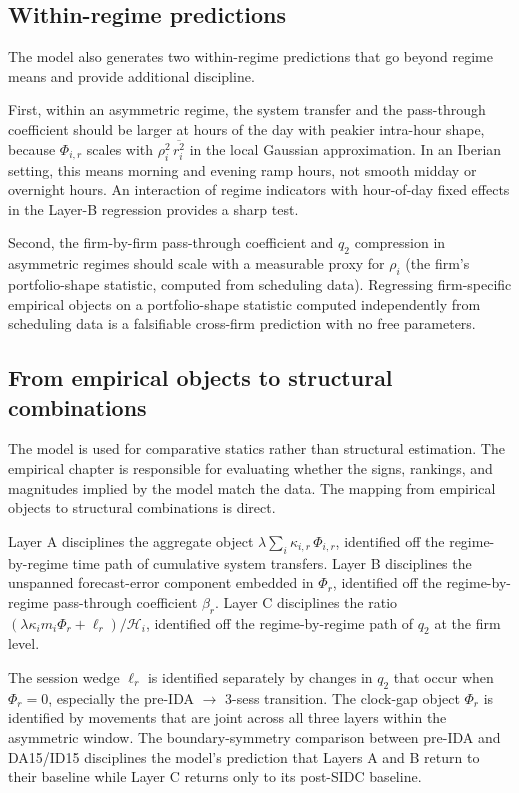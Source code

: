 \documentclass[11pt]{article}
\begin{document}
\subsection{Within-regime predictions}
\label{sec:model-within}

The model also generates two within-regime predictions that go beyond regime means and provide additional discipline.

First, within an asymmetric regime, the system transfer and the pass-through coefficient should be larger at hours of the day with peakier intra-hour shape, because $\Phi_{i,r}$ scales with $\rho_{i}^{2}\,\overline{r_{i}^{2}}$ in the local Gaussian approximation. In an Iberian setting, this means morning and evening ramp hours, not smooth midday or overnight hours. An interaction of regime indicators with hour-of-day fixed effects in the Layer-B regression provides a sharp test.

Second, the firm-by-firm pass-through coefficient and $q_{2}$ compression in asymmetric regimes should scale with a measurable proxy for $\rho_{i}$ (the firm's portfolio-shape statistic, computed from scheduling data). Regressing firm-specific empirical objects on a portfolio-shape statistic computed independently from scheduling data is a falsifiable cross-firm prediction with no free parameters.

\subsection{From empirical objects to structural combinations}
\label{sec:model-mapping}

The model is used for comparative statics rather than structural estimation. The empirical chapter is responsible for evaluating whether the signs, rankings, and magnitudes implied by the model match the data. The mapping from empirical objects to structural combinations is direct.

Layer A disciplines the aggregate object $\lambda \sum_{i} \kappa_{i,r}\,\Phi_{i,r}$, identified off the regime-by-regime time path of cumulative system transfers. Layer B disciplines the unspanned forecast-error component embedded in $\Phi_{r}$, identified off the regime-by-regime pass-through coefficient $\beta_{r}$. Layer C disciplines the ratio $(\lambda \kappa_{i} m_{i} \Phi_{r} + \ell_{r})/\mathcal{H}_{i}$, identified off the regime-by-regime path of $q_{2}$ at the firm level.

The session wedge $\ell_{r}$ is identified separately by changes in $q_{2}$ that occur when $\Phi_{r} = 0$, especially the pre-IDA $\to$ 3-sess transition. The clock-gap object $\Phi_{r}$ is identified by movements that are joint across all three layers within the asymmetric window. The boundary-symmetry comparison between pre-IDA and DA15/ID15 disciplines the model's prediction that Layers A and B return to their baseline while Layer C returns only to its post-SIDC baseline.
\end{document}
